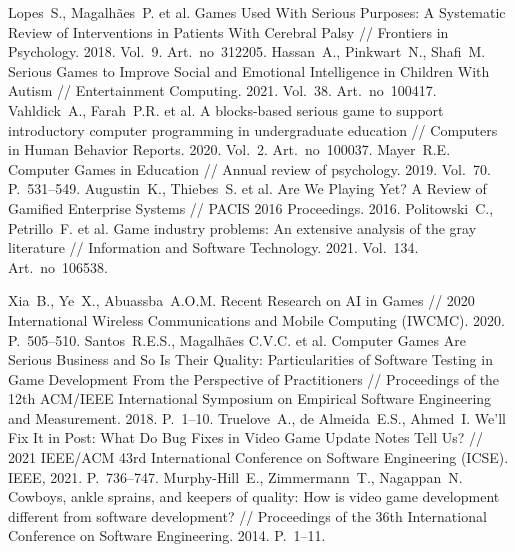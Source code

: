 \documentclass[a4paper,article,14pt]{extarticle}
\begin{document}


\tableofcontents
\pagebreak






\begin{thebibliography}{1}
	
 Lopes~S., Magalh{\~a}es~P. et al. Games Used With Serious Purposes: A Systematic Review of Interventions in Patients With Cerebral Palsy // Frontiers in Psychology. 2018. Vol.~9. Art.~no~312205.
 Hassan~A., Pinkwart~N., Shafi~M. Serious Games to Improve Social and Emotional Intelligence in Children With Autism // Entertainment Computing. 2021. Vol.~38. Art.~no~100417.
 Vahldick~A., Farah~P.R. et al. A blocks-based serious game to support introductory computer programming in undergraduate education // Computers in Human Behavior Reports. 2020. Vol.~2. Art.~no~100037.
 Mayer~R.E. Computer Games in Education // Annual review of psychology. 2019. Vol.~70. P.~531--549.
 Augustin~K., Thiebes~S. et al. Are We Playing Yet? A Review of Gamified Enterprise Systems // PACIS 2016 Proceedings. 2016.
 Politowski~C., Petrillo~F. et al. Game industry problems: An extensive analysis of the gray literature // Information and Software Technology. 2021. Vol.~134. Art.~no~106538.

 Xia~B., Ye~X., Abuassba~A.O.M. Recent Research on AI in Games // 2020 International Wireless Communications and Mobile Computing (IWCMC). 2020. P.~505--510.
 Santos~R.E.S., Magalh{\~a}es C.V.C. et al. Computer Games Are Serious Business and So Is Their Quality: Particularities of Software Testing in Game Development From the Perspective of Practitioners // Proceedings of the 12th ACM/IEEE International Symposium on Empirical Software Engineering and Measurement. 2018. P.~1--10.
 Truelove~A., de Almeida~E.S., Ahmed~I. We'll Fix It in Post: What Do Bug Fixes in Video Game Update Notes Tell Us? // 2021 IEEE/ACM 43rd International Conference on Software Engineering (ICSE). IEEE, 2021. P.~736--747.
 Murphy-Hill~E., Zimmermann~T., Nagappan~N. Cowboys, ankle sprains, and keepers of quality: How is video game development different from software development? // Proceedings of the 36th International Conference on Software Engineering. 2014. P.~1--11.


\end{thebibliography}
\end{document}
